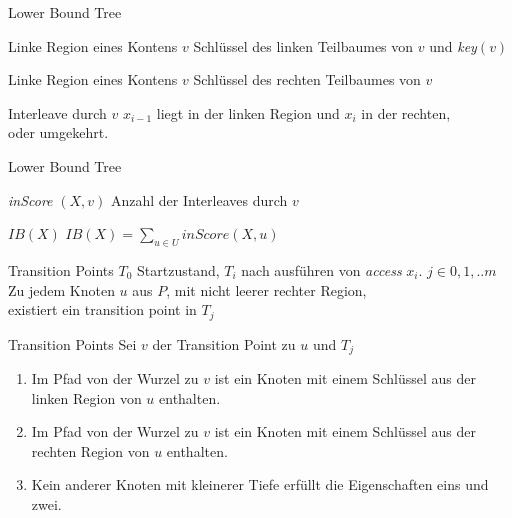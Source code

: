 \documentclass[11pt]{beamer}
\begin{document}
 \begin{frame} {Lower Bound Tree} 
	\begin{block}{Linke Region eines Kontens $v$}
	      Schlüssel des linken Teilbaumes von $v$ und \textit{key}$\left(v\right)$	
	\end{block}
    \begin{block}{Linke Region eines Kontens $v$}
	Schlüssel des rechten Teilbaumes von $v$
	\end{block}
	\begin{block}{Interleave durch $v$}
		$x_{i-1}$ liegt in der linken Region und $x_i$ in der rechten,\\
		oder umgekehrt.
    \end{block}
\end{frame}

 \begin{frame} {Lower Bound Tree} 
	\begin{block}{\textit{inScore} $\left(X, v\right)$}
		Anzahl der Interleaves durch $v$
	\end{block}
	\begin{block}{$\mathit{IB}\left(X\right)$}
		$\mathit{IB}\left(X\right) = \sum_{u \in U} \mathit{inScore}\left(X, u\right)$
	\end{block}
\end{frame}

\begin{frame} {Transition Points} 
	$T_0$ Startzustand, $T_i$ nach ausführen von \textit{access} $x_i$.
	\pause
	$j \in {0,1,..m}$\\
	\bigskip
	Zu jedem Knoten $u$ aus $P$, mit nicht leerer rechter Region,\\
	existiert ein transition point in $T_j$ 
	
	
\end{frame}

\begin{frame} {Transition Points} 
	Sei $v$ der Transition Point zu $u$ und $T_j$
	\begin{enumerate}
		\item Im Pfad von der Wurzel zu $v$ ist ein Knoten mit einem Schlüssel aus der linken Region von $u$ enthalten.
		\item Im Pfad von der Wurzel zu $v$ ist ein Knoten mit einem Schlüssel aus der rechten Region von $u$ enthalten.
		\item Kein anderer Knoten mit kleinerer Tiefe erfüllt die Eigenschaften eins und zwei. 
	\end{enumerate}	
\end{frame}
\end{document}
